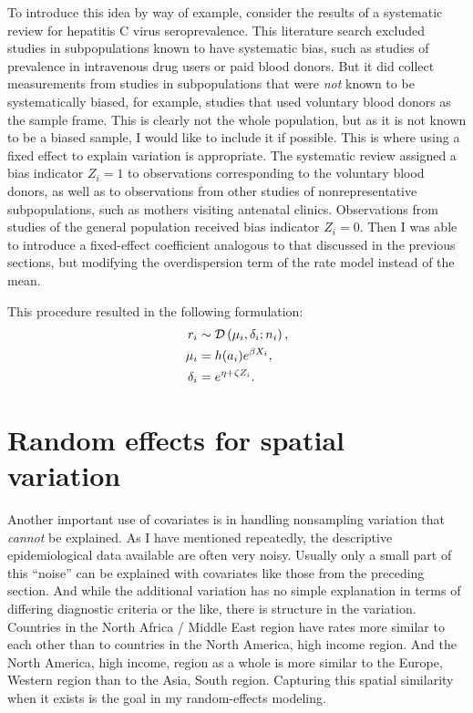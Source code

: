 To introduce this idea by way of example, consider the results of a
systematic review for hepatitis C virus seroprevalence.  This
literature search excluded studies in subpopulations known to have
systematic bias, such as studies of prevalence in intravenous drug
users or paid blood donors.  But it did collect measurements from
studies in subpopulations that were \emph{not} known to be
systematically biased, for example, studies that used voluntary blood
donors as the sample frame.  This is clearly not the whole population,
but as it is not known to be a biased sample, I would like to include
it if possible.  This is where using a fixed effect to explain
variation is appropriate. The systematic review assigned
a bias indicator $Z_i = 1$ to observations corresponding to
the voluntary blood donors, as well as to observations from other studies of nonrepresentative
subpopulations, such as mothers visiting antenatal clinics.
Observations from studies of the general
population received bias indicator $Z_i = 0$.  Then I was able to
introduce a fixed-effect coefficient analogous to that discussed in the previous sections,
but modifying the overdispersion term of the rate model instead of
the mean.

This procedure resulted in the following
formulation:
\begin{align*}
r_i &\sim \mathcal{D}\left(\mu_i, \delta_i; n_i\right),\\
\mu_i &= h(a_i)e^{\beta X_i},\\
\delta_i &= e^{\eta + \zeta Z_i}.
\end{align*}

\section{Random effects for spatial variation}
Another important use of covariates is in handling nonsampling
variation that \emph{cannot} be explained. As I have mentioned
repeatedly, the descriptive epidemiological data available are often
very noisy.  Usually only a small part of this ``noise''
can be explained with covariates like those from the preceding
section. And while the additional variation has no simple explanation
in terms of differing diagnostic criteria or the like, there is
structure in the variation. Countries in the North Africa / Middle East
region have rates more similar to each other than to countries in the
North America, high income region.  And the North America, high income,
region as a whole is more similar to the Europe, Western region than
to the Asia, South region.  Capturing this spatial similarity when it
exists is the goal in my random-effects modeling.


